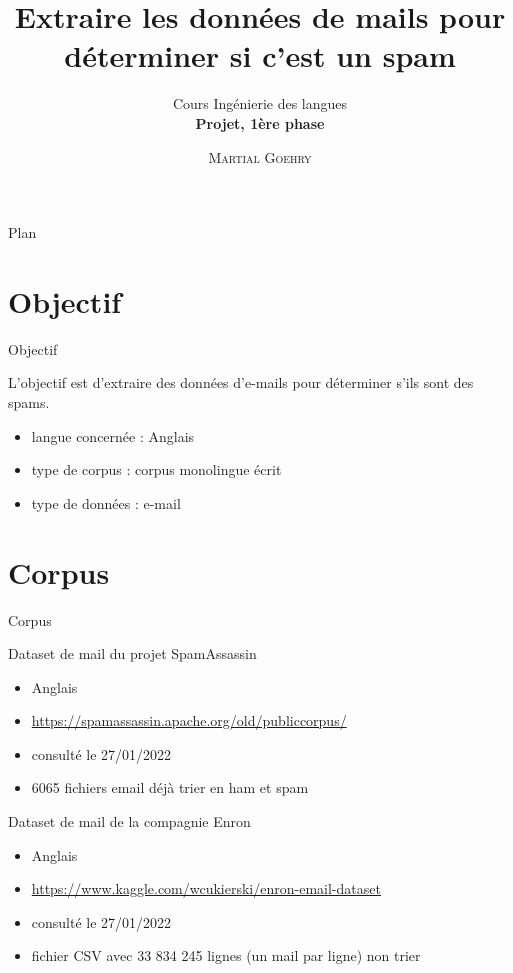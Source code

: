 \documentclass[xelatex,11pt, xcolor=dvipsnames]{beamer}
\subtitle{Cours Ingénierie des langues\\\textbf{Projet, 1ère phase}}
\institute{\normalsize Université Paris 8, LIASD\\
Licence d'informatique}
\title{Extraire les données de mails pour déterminer si c'est un spam}
\author[\textsc{M. Goehry}]{\textsc{Martial Goehry}}
\begin{document}
{ 
  \begin{frame}
  \titlepage
  \end{frame}

\note{
}
}

\begin{frame}{Plan}
  \tableofcontents[sectionstyle=show/show, hidesubsections]
\note{
}  
\end{frame}

\section{Objectif}

\begin{frame}{Objectif}
  \begin{block}{}
  L'objectif est d'extraire des données d'e-mails pour déterminer s'ils sont des spams.
  \end{block}
  \begin{itemize}
  \item langue concernée : Anglais
  \item type de corpus : corpus monolingue écrit
  \item type de données : e-mail
  \end{itemize}
\end{frame}

\section{Corpus}

\begin{frame}{Corpus}
	\begin{block}{Dataset de mail du projet SpamAssassin}
		\begin{itemize}
			\item Anglais
			\item \url{https://spamassassin.apache.org/old/publiccorpus/}
			\item consulté le 27/01/2022
			\item 6065 fichiers email déjà trier en ham et spam
		\end{itemize}
	\end{block}
	
	\begin{block}{Dataset de mail de la compagnie Enron}
		\begin{itemize}
			\item Anglais
			\item \url{https://www.kaggle.com/wcukierski/enron-email-dataset}
			\item consulté le 27/01/2022
			\item fichier CSV avec 33 834 245 lignes (un mail par ligne) non trier
		\end{itemize}
	\end{block}
\end{frame}
\end{document}
